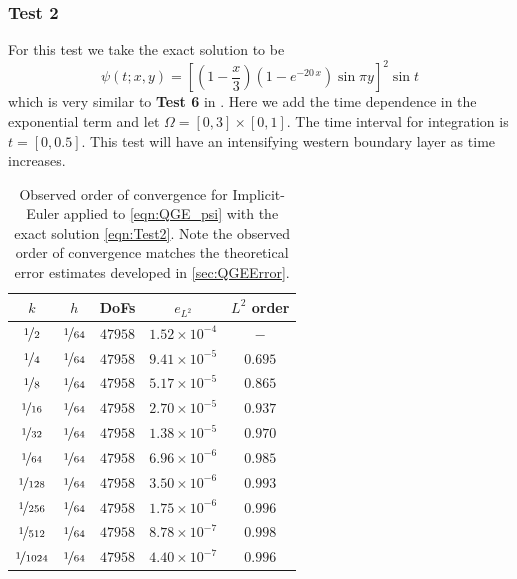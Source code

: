 \subsubsection*{Test 2}
For this test we take the exact solution to be
\begin{equation}
  \psi(t;x,y) = \left[(1-\frac{x}{3})\left(1-e^{-20\,x}\right) \sin \pi
    y\right]^2 \sin t
  \label{eqn:Test2}
\end{equation}
which is very similar to \textbf{Test 6} in \cite{Foster}. Here we add the time
dependence in the exponential term and let $\Omega = [0,3] \times [0,1]$. The
time interval for integration is $t = [0,0.5]$. This test will have an
intensifying western boundary layer as time increases.
\begin{table}
\begin{center}
  \begin{tabular}{|c|c|c|c|c|}
    \hline
    $k$ & $h$ & DoFs & $e_{L^2}$ & $L^2$ order \\
    \hline
    $\nicefrac{1}{2}$ & $\nicefrac{1}{64}$ & $47958$ & $1.52\times 10^{-4}$ & $-$\\
    $\nicefrac{1}{4}$ & $\nicefrac{1}{64}$ & $47958$ & $9.41\times 10^{-5}$ & $0.695$\\
    $\nicefrac{1}{8}$ & $\nicefrac{1}{64}$ & $47958$ & $5.17\times 10^{-5}$ & $0.865$\\
    $\nicefrac{1}{16}$ & $\nicefrac{1}{64}$ & $47958$ & $2.70\times 10^{-5}$ & $0.937$\\
    $\nicefrac{1}{32}$ & $\nicefrac{1}{64}$ & $47958$ & $1.38\times 10^{-5}$ & $0.970$\\
    $\nicefrac{1}{64}$ & $\nicefrac{1}{64}$ & $47958$ & $6.96\times 10^{-6}$ & $0.985$\\
    $\nicefrac{1}{128}$ & $\nicefrac{1}{64}$ & $47958$ & $3.50\times 10^{-6}$ & $0.993$\\
    $\nicefrac{1}{256}$ & $\nicefrac{1}{64}$ & $47958$ & $1.75\times 10^{-6}$ & $0.996$\\
    $\nicefrac{1}{512}$ & $\nicefrac{1}{64}$ & $47958$ & $8.78\times 10^{-7}$ & $0.998$\\
    $\nicefrac{1}{1024}$ & $\nicefrac{1}{64}$ & $47958$ & $4.40\times 10^{-7}$ & $0.996$\\
    \hline
  \end{tabular}
\end{center}
  \caption{Observed order of convergence for Implicit-Euler applied to
    \eqref{eqn:QGE_psi} with the exact solution \eqref{eqn:Test2}. Note the observed
    order of convergence matches the theoretical error estimates developed in
    \autoref{sec:QGEError}.}
  \label{tab:Test2Time}
\end{table}

